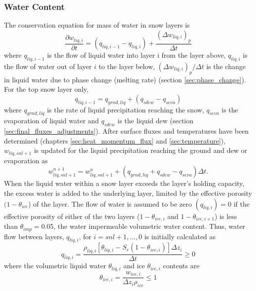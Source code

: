 \documentclass[12pt,authoryear]{elsarticle}
\numberwithin{equation}{section} %
\begin{document}
\subsubsection{Water Content}
\label{sec:water_content}
%
The conservation equation for mass of water in snow layers is
\begin{equation}
\frac{\partial w_{liq,i}}{\partial t} = (q_{liq,i-1}-q_{liq,i})+\frac{(\Delta w_{liq,i})_{p}}{\Delta t}
\end{equation}
where $q_{liq,i-1}$ is the flow of liquid water into layer i from the layer above, $q_{liq,i}$ is the flow of water out of layer $i$ to the layer below, $(\Delta w_{liq,i})_{p}/\Delta t$ is the change in liquid
water due to phase change (melting rate) (section \ref{sec:phase_change}). For the top snow layer only,
\begin{equation}
q_{liq,i-1}=q_{grnd,liq}+(q_{sdew}-q_{seva})
\end{equation}
where $q_{grnd,liq}$ is the rate of liquid precipitation reaching the snow, $q_{seva}$ is the evaporation of liquid water and $q_{sdew}$ is the liquid dew (section \ref{sec:final_fluxes_adjustments}). After surface fluxes and temperatures have been determined (chapters \ref{sec:heat_momentum_flux} and \ref{sec:temperature}), $w_{liq,snl+1}$ is updated for the liquid precipitation reaching the ground and dew or evaporation as
\begin{equation}
w_{liq,snl+1}^{n+1} = w_{liq,snl+1}^{n} + (q_{grnd,liq} + q_{sdew} - q_{seva})\Delta t.
\end{equation}
When the liquid water within a snow layer exceeds the layer’s holding capacity, the excess water is added to the underlying layer, limited by the effective porosity $(1-\theta_{ice}$) of the layer. The flow of water is assumed to be zero $(q_{liq,i})=0$ if the effective porosity of either of the two layers ($1-\theta_{ice,i}$ and $1-\theta_{ice,i+1}$) is less than $\theta_{imp}=$0.05, the water impermeable volumetric water content. Thus, water flow between layers, $q_{liq,i}$, for $i=snl+1,...,0$ is initially calculated as
\begin{equation}
\label{eq:water_flow_between_layers}
q_{liq,i}=\frac{\rho_{liq,i}\left[\theta_{liq,i}-S_{r}(1-\theta_{ice,i})\right]\Delta z_{i}}{\Delta t} \geq0
\end{equation}
where the volumetric liquid water $\theta_{liq,i}$ and ice $\theta_{ice,i}$ contents are
\begin{equation}
\theta_{ice,i} = \frac{w_{ice,i}}{\Delta z_{i}\rho_{ice}} \leq 1
\end{equation}
\end{document}
